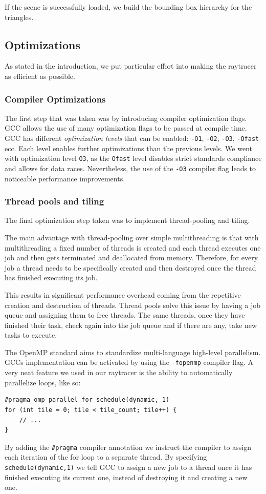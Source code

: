 \documentclass[tikz,14pt,fleqn]{article}
\begin{document}
If the scene is successfully loaded, we build the bounding box hierarchy for the triangles.

\subsection{Optimizations}
As stated in the introduction, we put particular effort into making the raytracer as efficient as possible.
\subsubsection{Compiler Optimizations}
The first step that was taken was by introducing compiler optimization flags. GCC allows the use of many optimization flags to be passed at compile time. GCC has different \textit{optimization levels} that can be enabled: \verb|-O1|, \verb|-O2|, \verb|-O3|, \verb|-Ofast| ecc. Each level enables further optimizations than the previous levels. We went with optimization level \verb|O3|, as the \verb|Ofast| level disables strict standards compliance and allows for data races. Nevertheless, the use of the \verb|-O3| compiler flag leads to noticeable performance improvements.



\subsubsection{Thread pools and tiling}
The final optimization step taken was to implement thread-pooling and tiling.

The main advantage with thread-pooling over simple multithreading is that with multithreading a fixed number of threads is created and each thread executes one job and then gets terminated and deallocated from memory. Therefore, for every job a thread needs to be specifically created and then destroyed once the thread has finished executing its job.

This results in significant performance overhead coming from the repetitive creation and destruction of threads. Thread pools solve this issue by having a job queue and assigning them to free threads. The same threads, once they have finished their task, check again into the job queue and if there are any, take new tasks to execute.

The OpenMP standard aims to standardize multi-language high-level parallelism. GCCs implementation can be activated by using the \verb|-fopenmp| compiler flag. A very neat feature we used in our raytracer is the ability to automatically parallelize loops, like so:
\begin{verbatim}
#pragma omp parallel for schedule(dynamic, 1)
for (int tile = 0; tile < tile_count; tile++) {
    // ...
}
\end{verbatim}
By adding the \texttt{#pragma} compiler annotation we instruct the compiler to assign each iteration of the for loop to a separate thread. By specifying \texttt{schedule(dynamic,1)} we tell GCC to assign a new job to a thread once it has finished executing its current one, instead of destroying it and creating a new one.
\end{document}
